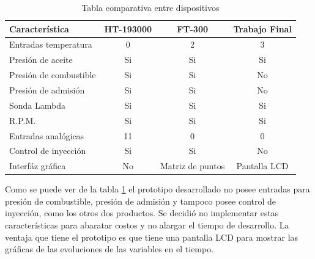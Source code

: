 \hfil
\begin{table}[h]
	\centering
	\caption[Tabla comparativa entre dispositivos]{Tabla comparativa entre dispositivos}
	\centering
	\begin{tabular}{l c c c}    
		\toprule
		\textbf{Característica }     & \textbf{HT-193000} & \textbf{FT-300} & \textbf{Trabajo Final}\\
		\midrule
		Entradas temperatura	&  0 &   2 &  3\\
		Presión de aceite		& Si &  Si & Si\\
		Presión de combustible	& Si &  Si & No\\
		Presión de admisión		& Si &  Si & No\\
		Sonda Lambda			& Si &  Si & Si\\
		R.P.M.					& Si &  Si & Si\\
		Entradas analógicas		& 11 &  0  &  0\\
		Control de inyección	& Si &  Si & No\\
		Interfáz gráfica		& No &  Matriz de puntos & Pantalla LCD \\
		\bottomrule
	\end{tabular}
	\label{tab:comparativa}
\end{table}

Como se puede ver de la tabla \ref{tab:comparativa} el prototipo desarrollado no posee entradas para presión de combustible, presión de admisión y tampoco posee control de inyección, como los otros dos productos. Se decidió no implementar estas características para abaratar costos y no alargar el tiempo de desarrollo. La ventaja que tiene el prototipo es que tiene una pantalla LCD para mostrar las gráficas de las evoluciones de las variables en el tiempo.
